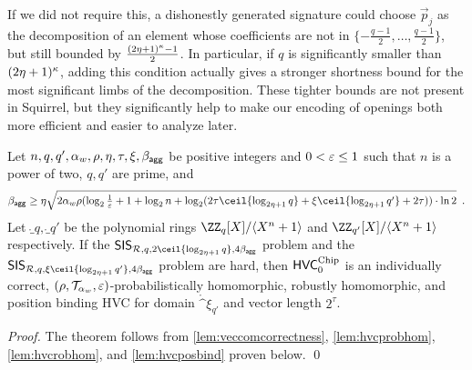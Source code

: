 \begin{remark}
\begin{enumerate}
If we did not require this, a dishonestly generated signature could choose $\vec{p}_j$ as the decomposition of an element whose coefficients are not in $\{-\tfrac{q-1}{2},\ldots,\tfrac{q-1}{2}\}$, but still bounded by $\frac{(2\eta+1)^\kappa-1}{2}$.
In particular, if $q$ is significantly smaller than $(2\eta+1)^\kappa$, adding this condition actually gives a stronger shortness bound for the most significant limbs of the decomposition.
These tighter bounds are not present in Squirrel, but they significantly help to make our encoding of openings both more efficient and easier to analyze later.
\end{enumerate}
\end{remark}

\begin{theorem}\label{theo:veccom}
  Let $n,q,q',\alpha_w,\rho,\eta,\tau,\xi,\beta_{\mathsf{agg}}$ be positive integers and $0 < \varepsilon \leq 1$ such that $n$ is a power of two, $q,q'$ are prime, and 
\[
  \bagg \geq \eta\sqrt{2\alpha_w\rho(\log_2\tfrac{1}{\errorbound} + 1 +\log_2 n + \log_2(2\tau \ceil{\log_{2\eta+1}q} + \xi\ceil{\log_{2\eta+1}q'} + 2\tau))\cdot\ln2}
\enspace.\]
  Let $\ring_q,\ring_{q'}$ be the polynomial rings $\defringq$ and $\defringqq$ respectively.
  If the $\sis_{\ring,q,2\ceil{\log_{2\eta+1} q},4\bagg}$ problem and the $\sis_{\ring,q,\xi\ceil{\log_{2\eta+1} q'} ,4\bagg}$ problem are hard,
  then $\mathsf{HVC}^{\textup{Chip}}_{0}$ is an individually correct, $(\rho,\mathcal{T}_{\alpha_w},\varepsilon)$-probabilistically homomorphic, robustly homomorphic, and position binding HVC for domain $\ring^{\xi}_{q'}$ and vector length $2^\tau$.
\end{theorem}
\begin{proof}
  The theorem follows from \autoref{lem:veccomcorrectness}, \autoref{lem:hvcprobhom}, \autoref{lem:hvcrobhom}, and \autoref{lem:hvcposbind} proven below. \qed
\end{proof}

